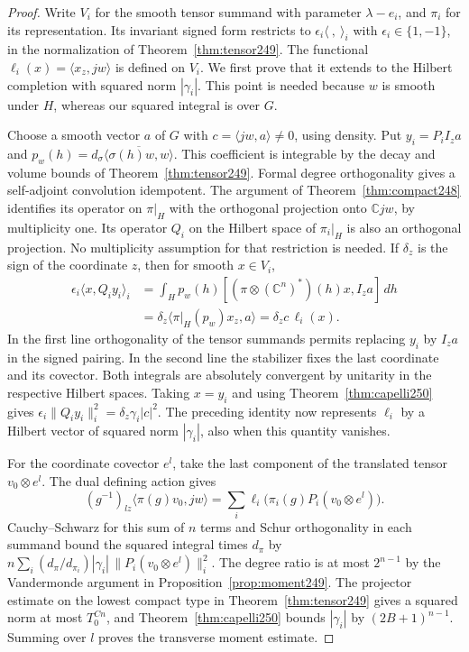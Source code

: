 \documentclass[a4paper,11pt]{article}
\theoremstyle{definition}
\theoremstyle{remark}
\numberwithin{equation}{section}
\begin{document}
\begin{proof}
Write \(V_i\) for the smooth tensor summand with parameter
\(\lambda-e_i\), and \(\pi_i\) for its representation. Its invariant
signed form restricts to \(\epsilon_i\langle\ ,\ \rangle_i\) with
\(\epsilon_i\in\{1,-1\}\), in the normalization of
Theorem~\ref{thm:tensor249}. The functional \(\ell_i(x)=\langle x_z,jw\rangle\)
is defined on \(V_i\). We first prove that it extends to the Hilbert
completion with squared norm \(|\gamma_i|\). This point is needed because
\(w\) is smooth under \(H\), whereas our squared integral is over \(G\).

Choose a smooth vector \(a\) of \(G\) with \(c=\langle jw,a\rangle\ne0\),
using density. Put \(y_i=P_i I_z a\) and
\(p_w(h)=d_\sigma\overline{\langle\sigma(h)w,w\rangle}\). This
coefficient is integrable by the decay and volume bounds of
Theorem~\ref{thm:tensor249}. Formal degree orthogonality gives a
self-adjoint convolution idempotent. The argument of
Theorem~\ref{thm:compact248} identifies its operator on \(\pi|_H\)
with the orthogonal projection onto \(\mathbb C jw\), by multiplicity
one. Its operator \(Q_i\) on the Hilbert space of \(\pi_i|_H\) is
also an orthogonal projection. No multiplicity assumption for that
restriction is needed. If \(\delta_z\) is the sign of the coordinate
\(z\), then for smooth \(x\in V_i\),
\[
 \begin{aligned}
 \epsilon_i\langle x,Q_i y_i\rangle_i
  &=\int_H p_w(h)[(\pi\otimes (\mathbb C^n)^*)(h)x,I_z a]\,dh\\
  &=\delta_z\langle\pi|_H(p_w)x_z,a\rangle
    =\delta_z c\,\ell_i(x).
 \end{aligned}
\]
In the first line orthogonality of the tensor summands permits replacing
\(y_i\) by \(I_z a\) in the signed pairing. In the second line the
stabilizer fixes the last coordinate and its covector. Both integrals
are absolutely convergent by unitarity in the respective Hilbert
spaces. Taking \(x=y_i\) and using Theorem~\ref{thm:capelli250} gives
\(\epsilon_i\|Q_i y_i\|_i^2=\delta_z\gamma_i |c|^2\).
The preceding identity now represents \(\ell_i\) by a Hilbert vector
of squared norm \(|\gamma_i|\), also when this quantity vanishes.

For the coordinate covector \(e^l\), take the last component of the
translated tensor \(v_0\otimes e^l\). The dual defining action gives
\[
 (g^{-1})_{lz}\langle\pi(g)v_0,jw\rangle
       =\sum_i \ell_i\bigl(\pi_i(g)P_i(v_0\otimes e^l)\bigr).
\]
Cauchy--Schwarz for this sum of \(n\) terms and Schur orthogonality in
each summand bound the squared integral times \(d_\pi\) by
\(n\sum_i (d_\pi/d_{\pi_i}) |\gamma_i|\,\|P_i(v_0\otimes e^l)\|_i^2\).
The degree ratio is at most \(2^{n-1}\) by the Vandermonde argument
in Proposition~\ref{prop:moment249}. The projector estimate on the
lowest compact type in Theorem~\ref{thm:tensor249} gives a squared
norm at most \(T_0^{C n}\), and Theorem~\ref{thm:capelli250} bounds
\(|\gamma_i|\) by \((2B+1)^{n-1}\). Summing over \(l\) proves the
transverse moment estimate.


\end{proof}
\end{document}
